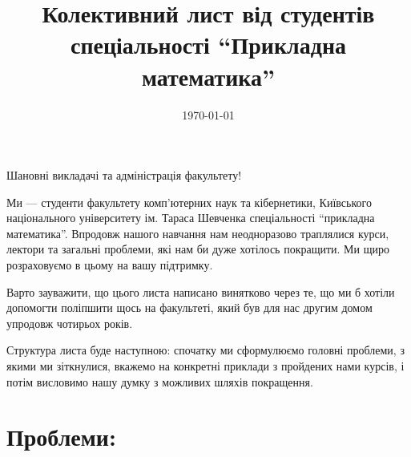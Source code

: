 \documentclass[14pt, a4paper]{extarticle}  %
\title{Колективний лист від студентів спеціальності ``Прикладна математика''}
\date{\today}
\begin{document}
\maketitle

Шановні викладачі та адміністрація факультету!

Ми --- студенти факультету комп'ютерних наук та кібернетики, Київського національного університету ім. Тараса Шевченка спеціальності ``прикладна математика''. Впродовж нашого навчання нам неодноразово траплялися курси, лектори та загальні проблеми, які нам би дуже хотілось покращити. Ми щиро розраховуємо в цьому на вашу підтримку. 

Варто зауважити, що цього листа написано винятково через те, що ми б хотіли допомогти поліпшити щось на факультеті, який був для нас другим домом упродовж чотирьох років.

Структура листа буде наступною: спочатку ми сформулюємо головні проблеми, з якими ми зіткнулися, вкажемо на конкретні приклади з пройдених нами курсів, і потім висловимо нашу думку з можливих шляхів покращення. 

\tableofcontents

\newpage
\section{Проблеми:}
\end{document}
